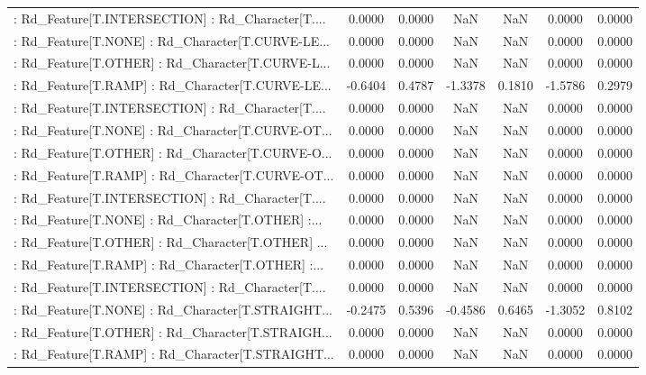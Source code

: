 \begin{longtable}{p{4cm}cccccc}
 : Rd\_Feature[T.INTERSECTION] : Rd\_Character[T.... &  0.0000 &    0.0000 &     NaN &          NaN &  0.0000 &  0.0000 \\
 : Rd\_Feature[T.NONE] : Rd\_Character[T.CURVE-LE... &  0.0000 &    0.0000 &     NaN &          NaN &  0.0000 &  0.0000 \\
 : Rd\_Feature[T.OTHER] : Rd\_Character[T.CURVE-L... &  0.0000 &    0.0000 &     NaN &          NaN &  0.0000 &  0.0000 \\
 : Rd\_Feature[T.RAMP] : Rd\_Character[T.CURVE-LE... & -0.6404 &    0.4787 & -1.3378 &       0.1810 & -1.5786 &  0.2979 \\
 : Rd\_Feature[T.INTERSECTION] : Rd\_Character[T.... &  0.0000 &    0.0000 &     NaN &          NaN &  0.0000 &  0.0000 \\
 : Rd\_Feature[T.NONE] : Rd\_Character[T.CURVE-OT... &  0.0000 &    0.0000 &     NaN &          NaN &  0.0000 &  0.0000 \\
 : Rd\_Feature[T.OTHER] : Rd\_Character[T.CURVE-O... &  0.0000 &    0.0000 &     NaN &          NaN &  0.0000 &  0.0000 \\
 : Rd\_Feature[T.RAMP] : Rd\_Character[T.CURVE-OT... &  0.0000 &    0.0000 &     NaN &          NaN &  0.0000 &  0.0000 \\
 : Rd\_Feature[T.INTERSECTION] : Rd\_Character[T.... &  0.0000 &    0.0000 &     NaN &          NaN &  0.0000 &  0.0000 \\
 : Rd\_Feature[T.NONE] : Rd\_Character[T.OTHER] :... &  0.0000 &    0.0000 &     NaN &          NaN &  0.0000 &  0.0000 \\
 : Rd\_Feature[T.OTHER] : Rd\_Character[T.OTHER] ... &  0.0000 &    0.0000 &     NaN &          NaN &  0.0000 &  0.0000 \\
 : Rd\_Feature[T.RAMP] : Rd\_Character[T.OTHER] :... &  0.0000 &    0.0000 &     NaN &          NaN &  0.0000 &  0.0000 \\
 : Rd\_Feature[T.INTERSECTION] : Rd\_Character[T.... &  0.0000 &    0.0000 &     NaN &          NaN &  0.0000 &  0.0000 \\
 : Rd\_Feature[T.NONE] : Rd\_Character[T.STRAIGHT... & -0.2475 &    0.5396 & -0.4586 &       0.6465 & -1.3052 &  0.8102 \\
 : Rd\_Feature[T.OTHER] : Rd\_Character[T.STRAIGH... &  0.0000 &    0.0000 &     NaN &          NaN &  0.0000 &  0.0000 \\
 : Rd\_Feature[T.RAMP] : Rd\_Character[T.STRAIGHT... &  0.0000 &    0.0000 &     NaN &          NaN &  0.0000 &  0.0000 \\

\end{longtable}
